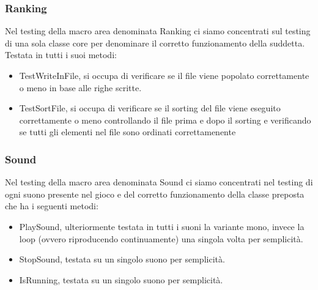 \documentclass[12pt, letterpaper]{article}
\begin{document}
        \subsubsection{Ranking}
            Nel testing della macro area denominata Ranking ci siamo concentrati sul testing di una sola classe core per denominare il corretto funzionamento della suddetta.
            Testata in tutti i suoi metodi:
                \begin{itemize}
                    \item TestWriteInFile, si occupa di verificare se il file viene popolato correttamente o meno in base alle righe scritte.
                    \item TestSortFile, si occupa di verificare se il sorting del file viene eseguito correttamente o meno controllando il file prima e dopo il sorting e verificando se tutti gli elementi nel file sono ordinati correttamenente
                \end{itemize}
        \subsubsection{Sound}
            Nel testing della macro area denominata Sound ci siamo concentrati nel testing di ogni suono presente nel gioco e del corretto funzionamento della classe preposta che ha i seguenti metodi:
                \begin{itemize}
                    \item PlaySound, ulteriormente testata in tutti i suoni la variante mono, invece la loop (ovvero riproducendo continuamente) una singola volta per semplicità.
                    \item StopSound, testata su un singolo suono per semplicità.
                    \item IsRunning, testata su un singolo suono per semplicità.
                \end{itemize}
    \newpage
\end{document}
